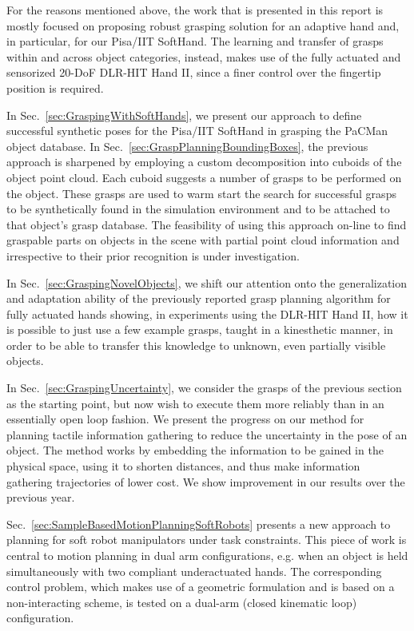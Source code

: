 \documentclass[a4paper,11pt,pdf]{pacmanreport}
\begin{document}
For the reasons mentioned above, the work that is presented in this report is mostly focused on proposing robust grasping solution for an adaptive hand and, in particular, for our Pisa/IIT SoftHand. The learning and transfer of grasps within and across object categories, instead, makes use of the fully actuated and sensorized 20-DoF DLR-HIT Hand II, since a finer control over the fingertip position is required.

In Sec.~\ref{sec:GraspingWithSoftHands}, we present our approach to define successful synthetic poses for the Pisa/IIT SoftHand in grasping the PaCMan object database. In Sec.~\ref{sec:GraspPlanningBoundingBoxes}, the previous approach is sharpened by employing a custom decomposition into cuboids of the object point cloud. Each cuboid suggests a number of grasps to be performed on the object. These grasps are used to warm start the search for successful grasps to be synthetically found in the simulation environment and to be attached to that object's grasp database. The feasibility of using this approach on-line to find graspable parts on objects in the scene with partial point cloud information and irrespective to their prior recognition is under investigation.

In Sec.~\ref{sec:GraspingNovelObjects}, we shift our attention onto the generalization and adaptation ability of the previously reported grasp planning algorithm for fully actuated hands showing, in experiments using the DLR-HIT Hand II, how it is possible to just use a few example grasps, taught in a kinesthetic manner, in order to be able to transfer this knowledge to unknown, even partially visible objects.

In Sec.~\ref{sec:GraspingUncertainty}, we consider the grasps of the previous section as the starting point, but now wish to execute them more reliably than in an essentially open loop fashion. We present the progress on our method for planning tactile information gathering to reduce the uncertainty in the pose of an object. The method works by embedding the information to be gained in the physical space, using it to shorten distances, and thus make information gathering trajectories of lower cost. We show improvement in our results over the previous year.

Sec.~\ref{sec:SampleBasedMotionPlanningSoftRobots} presents a new approach to planning for soft robot manipulators under task constraints. This piece of work is central to motion planning in dual arm configurations, e.g. when an object is held simultaneously with two compliant underactuated hands. The corresponding control problem, which makes use of a geometric formulation and is based on a non-interacting scheme, is tested on a dual-arm (closed kinematic loop) configuration.
\end{document}
